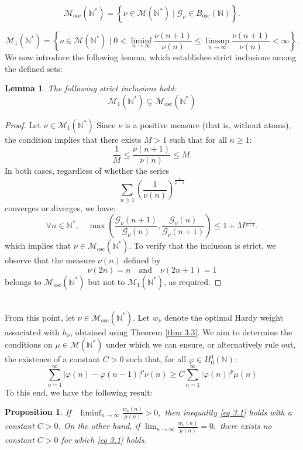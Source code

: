 \documentclass[11pt]{amsart}
\newtheorem{lem}[thm]{Lemma}
\newtheorem{prop}[thm]{Proposition}
\newcommand{\1}{[1]}
\def\phi{\varphi}
\begin{document}
$$\mathcal{M}_{\text{osc}}(\mathbb{N}^{*}) = \left\{ \nu \in \mathcal{M}(\mathbb{N}^{*}) \mid \mathcal{G}_{\nu} \in B_{\text{osc}}(\mathbb{N}) \right\}.$$

 $$ \mathcal{M}_{1}(\mathbb{N}^{*}) = \left\{ \nu \in \mathcal{M}(\mathbb{N}^{*}) \mid 0 < \liminf_{n \to \infty} \frac{\nu(n+1)}{\nu(n)} \leq \limsup_{n \to \infty} \frac{\nu(n+1)}{\nu(n)} < \infty \right\}.$$
We now introduce the following lemma, which establishes strict inclusions among the defined sets:

\begin{lem} \label{lem 3.4} The following strict inclusions hold:  
$$
\mathcal{M}_{1}(\mathbb{N}^{*}) \subsetneq \mathcal{M}_{\text{osc}}(\mathbb{N}^{*})$$
\end{lem}

\begin{proof}
Let $\nu \in \mathcal{M}_{1}(\mathbb{N}^{*})$ Since $\nu$ is a positive measure (that is, without atoms), the condition implies that there exists $M > 1$ such that for all $n\geq 1$:  
$$
\frac{1}{M} \leq \frac{\nu(n+1)}{\nu(n)} \leq M.
$$
In both cases, regardless of whether the series 
$$\sum_{n \geq 1} \left( \frac{1}{\nu(n)} \right)^{\frac{1}{p-1}}  
$$  
converges or diverges, we have: 
$$
\forall n \in \mathbb{N}^{*}, \quad \max \left( \frac{\mathcal{G}_{\nu}(n+1)}{\mathcal{G}_{\nu}(n)}, \frac{\mathcal{G}_{\nu}(n)}{\mathcal{G}_{\nu}(n+1)} \right) \leq 1 + M^{\frac{1}{p-1}}.  
$$  
which implies that $\nu \in \mathcal{M}_{\text{osc}}(\mathbb{N}^{*})$. To verify that the inclusion is strict, we observe that the measure $\nu(n)$ defined  by
$$\nu(2n) = n \quad \text{and} \quad \nu(2n+1) = 1 $$  
belongs to $\mathcal{M}_{\text{osc}}(\mathbb{N}^{*})$ but not to $\mathcal{M}_{1}(\mathbb{N}^{*})$, as required.
\end{proof}
\phantom{.} \\ 
From this point, let $\nu \in \mathcal{M}_{\text{osc}}(\mathbb{N}^{*})$. Let $w_{\nu}$ denote the optimal Hardy weight associated with $h_{\nu}$, obtained using Theorem \eqref{thm 3.3}. We aim to determine the conditions on $\mu \in \mathcal{M}(\mathbb{N}^{*})$ under which we can ensure, or alternatively rule out, the existence of a constant $C>0$ such that, for all $\phi \in H_{0}^{1}(\mathbb{N}):$
\begin{equation}
\sum_{n=1}^{\infty} |\phi(n)-\phi(n-1)|^p \nu(n) \geq C   \sum_{n=1}^{\infty} |\phi(n)|^p \mu(n)
\tag{3.1} \label{eq 3.1}
\end{equation}
To this end, we have the following result:
\begin{prop} \label{prop 3.5} If \, $ \displaystyle \liminf_{n \to \infty} \frac{w_{\nu}(n)}{\mu(n)} > 0,$ 
then inequality \eqref{eq 3.1} holds with a constant \( C > 0 \). On the other hand, if  $\displaystyle \lim_{n \to \infty} \frac{w_{\nu}(n)}{\mu(n)} = 0,$ 
there exists no constant \( C > 0 \) for which \eqref{eq 3.1} holds.
\end{prop}
\end{document}
